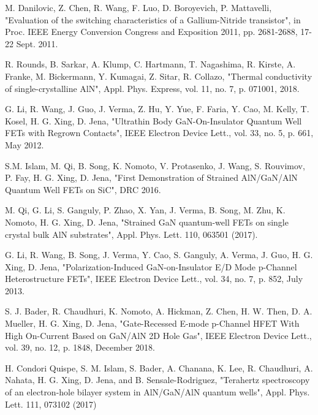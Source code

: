 \documentclass[journal]{IEEEtran}
\begin{document}
{\color{white}
\pagebreak
}


%

\begin{thebibliography}{00}

 M. Danilovic, Z. Chen, R. Wang, F. Luo, D. Boroyevich, P. Mattavelli, "Evaluation of the switching characteristics of a Gallium-Nitride transistor", in Proc. IEEE Energy Conversion Congress and Exposition 2011, pp. 2681-2688, 17-22 Sept. 2011.

 R. Rounds, B. Sarkar, A. Klump, C. Hartmann, T. Nagashima, R. Kirste, A. Franke, M. Bickermann, Y. Kumagai, Z. Sitar, R. Collazo, "Thermal conductivity of single-crystalline AlN", Appl. Phys. Express, vol. 11, no. 7, p. 071001, 2018.

 G. Li, R. Wang, J. Guo, J. Verma, Z. Hu, Y. Yue, F. Faria, Y. Cao, M. Kelly, T. Kosel, H. G. Xing, D. Jena, "Ultrathin Body GaN-On-Insulator Quantum Well FETs with Regrown Contacts",  IEEE Electron Device Lett., vol. 33, no. 5, p. 661, May 2012.

 S.M. Islam, M. Qi, B. Song, K. Nomoto, V. Protasenko, J. Wang, S. Rouvimov, P. Fay, H. G. Xing, D. Jena, "First Demonstration of Strained AlN/GaN/AlN Quantum Well FETs on SiC", DRC 2016.

 M. Qi, G. Li, S. Ganguly, P. Zhao, X. Yan, J. Verma, B. Song, M. Zhu, K. Nomoto, H. G. Xing, D. Jena, "Strained GaN quantum-well FETs on single crystal bulk AlN substrates", Appl. Phys. Lett. 110, 063501 (2017).

 G. Li, R. Wang, B. Song, J. Verma, Y. Cao, S. Ganguly, A. Verma, J. Guo, H. G. Xing, D. Jena, "Polarization-Induced GaN-on-Insulator E/D Mode p-Channel Heterostructure FETs", IEEE Electron Device Lett., vol. 34, no. 7, p. 852, July 2013.

 S. J. Bader, R. Chaudhuri, K. Nomoto, A. Hickman, Z. Chen, H. W. Then, D. A. Mueller, H. G. Xing, D. Jena, "Gate-Recessed E-mode p-Channel HFET With High On-Current Based on GaN/AlN 2D Hole Gas", IEEE Electron Device Lett., vol. 39, no. 12, p. 1848, December 2018.

 H. Condori Quispe, S. M. Islam, S. Bader, A. Chanana, K. Lee, R. Chaudhuri, A. Nahata, H. G. Xing, D. Jena, and B. Sensale-Rodriguez, "Terahertz spectroscopy of an electron-hole bilayer system in AlN/GaN/AlN quantum wells", Appl. Phys. Lett. 111, 073102 (2017)


\end{thebibliography}
\end{document}
